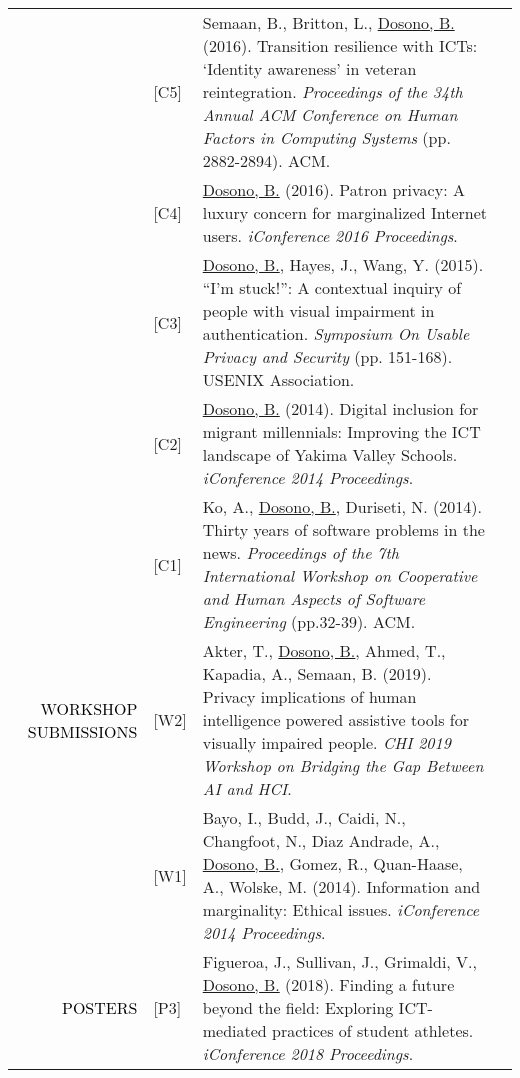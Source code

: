 \documentclass[12pt]{article}
\begin{document}
{{\begin{longtable}{Rp{1.0in}p{0.25in}p{4.75in}}
& \footnotesize{[C5]} & Semaan, B., Britton, L., \href{http://dl.acm.org/authorize?N41455}{{Dosono, B.}} (2016). Transition resilience with ICTs: ‘Identity awareness’ in veteran reintegration. \textit{Proceedings of the 34th Annual ACM Conference on Human Factors in Computing Systems} (pp. 2882-2894). ACM. \\

& \footnotesize{[C4]} & \href{https://doi.org/10.9776/16285}{{Dosono, B.}} (2016). Patron privacy: A luxury concern for marginalized Internet users.\textit{ iConference 2016 Proceedings}. \\

& \footnotesize{[C3]} & \href{https://www.usenix.org/conference/soups2015/proceedings/presentation/dosono}{{Dosono, B.}}, Hayes, J., Wang, Y. (2015). ``I’m stuck!'': A contextual inquiry of people with visual impairment in authentication. \textit{Symposium On Usable Privacy and Security} (pp. 151-168). USENIX Association. \\

& \footnotesize{[C2]} & \href{https://doi.org/10.9776/14043}{{Dosono, B.}} (2014). Digital inclusion for migrant millennials: Improving the ICT landscape of Yakima Valley Schools. \textit{iConference 2014 Proceedings}. \\

& \footnotesize{[C1]} & Ko, A., \href{http://dl.acm.org/authorize?N41457}{{Dosono, B.}}, Duriseti, N. (2014). Thirty years of software problems in the news. \textit{Proceedings of the 7th International Workshop on Cooperative and Human Aspects of Software Engineering} (pp.32-39). ACM. \\

\textcolor{black}{\footnotesize{\uppercase{Workshop Submissions}}} & \footnotesize{[W2]} & Akter, T., \href{https://chi2019.acm.org/accepted-workshops/#W09}{{Dosono, B.}}, Ahmed, T., Kapadia, A., Semaan, B. (2019). Privacy implications of human intelligence powered assistive tools for visually impaired people. \textit{CHI 2019 Workshop on Bridging the Gap Between AI and HCI}. \\

& \footnotesize{[W1]} & Bayo, I., Budd, J., Caidi, N., Changfoot, N., Diaz Andrade, A., \href{https://doi.org/10.9776/14223}{{Dosono, B.}}, Gomez, R., Quan-Haase, A., Wolske, M. (2014). Information and marginality: Ethical issues. \textit{iConference 2014 Proceedings}. \\

\textcolor{black}{\footnotesize{\uppercase{Posters}}} & \footnotesize{[P3]} & Figueroa, J., Sullivan, J., Grimaldi, V., \href{https://www.ideals.illinois.edu/handle/2142/100251}{{Dosono, B.}} (2018). Finding a future beyond the field: Exploring ICT-mediated practices of student athletes. \textit{iConference 2018 Proceedings}. \\


\end{longtable}}}
\end{document}
